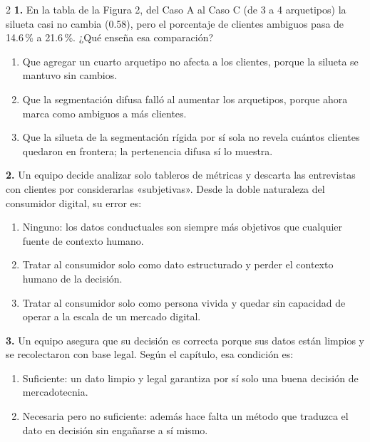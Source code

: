 \documentclass[10pt,letterpaper]{article}
\begin{document}
\begin{multicols}{2}
\noindent\textbf{1.} En la tabla de la Figura 2, del Caso A al Caso C (de 3 a 4 arquetipos) la silueta casi no cambia (0.58), pero el porcentaje de clientes ambiguos pasa de 14.6\,\% a 21.6\,\%. ¿Qué enseña esa comparación?
\vspace{-3pt}
\begin{enumerate}[label=\alph*),leftmargin=1.1em,itemsep=0pt,topsep=1pt,parsep=0pt,partopsep=0pt]
\item Que agregar un cuarto arquetipo no afecta a los clientes, porque la silueta se mantuvo sin cambios.
\item Que la segmentación difusa falló al aumentar los arquetipos, porque ahora marca como ambiguos a más clientes.
\item Que la silueta de la segmentación rígida por sí sola no revela cuántos clientes quedaron en frontera; la pertenencia difusa sí lo muestra.
\end{enumerate}
\vspace{2pt}
\noindent\textbf{2.} Un equipo decide analizar solo tableros de métricas y descarta las entrevistas con clientes por considerarlas «subjetivas». Desde la doble naturaleza del consumidor digital, su error es:
\vspace{-3pt}
\begin{enumerate}[label=\alph*),leftmargin=1.1em,itemsep=0pt,topsep=1pt,parsep=0pt,partopsep=0pt]
\item Ninguno: los datos conductuales son siempre más objetivos que cualquier fuente de contexto humano.
\item Tratar al consumidor solo como dato estructurado y perder el contexto humano de la decisión.
\item Tratar al consumidor solo como persona vivida y quedar sin capacidad de operar a la escala de un mercado digital.
\end{enumerate}
\vspace{2pt}
\noindent\textbf{3.} Un equipo asegura que su decisión es correcta porque sus datos están limpios y se recolectaron con base legal. Según el capítulo, esa condición es:
\vspace{-3pt}
\begin{enumerate}[label=\alph*),leftmargin=1.1em,itemsep=0pt,topsep=1pt,parsep=0pt,partopsep=0pt]
\item Suficiente: un dato limpio y legal garantiza por sí solo una buena decisión de mercadotecnia.
\item Necesaria pero no suficiente: además hace falta un método que traduzca el dato en decisión sin engañarse a sí mismo.

\end{enumerate}
\end{multicols}
\end{document}
